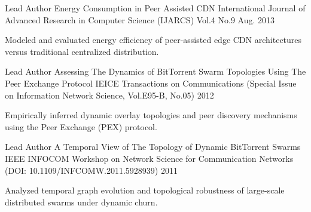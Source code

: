 

\begin{cventries}

  \cventry
    {Lead Author} %
    {Energy Consumption in Peer Assisted CDN} %
    {International Journal of Advanced Research in Computer Science (IJARCS) Vol.4 No.9} %
    {Aug. 2013} %
    {
      \begin{cvitems} %
        \item {Modeled and evaluated energy efficiency of peer-assisted edge CDN architectures versus traditional centralized distribution.}
      \end{cvitems}
    }

  \cventry
    {Lead Author} %
    {Assessing The Dynamics of BitTorrent Swarm Topologies Using The Peer Exchange Protocol} %
    {IEICE Transactions on Communications (Special Issue on Information Network Science, Vol.E95-B, No.05)} %
    {2012} %
    {
      \begin{cvitems} %
        \item {Empirically inferred dynamic overlay topologies and peer discovery mechanisms using the Peer Exchange (PEX) protocol.}
      \end{cvitems}
    }

  \cventry
    {Lead Author} %
    {A Temporal View of The Topology of Dynamic BitTorrent Swarms} %
    {IEEE INFOCOM Workshop on Network Science for Communication Networks (DOI: 10.1109/INFCOMW.2011.5928939)} %
    {2011} %
    {
      \begin{cvitems} %
        \item {Analyzed temporal graph evolution and topological robustness of large-scale distributed swarms under dynamic churn.}
      \end{cvitems}
    }

\end{cventries}
